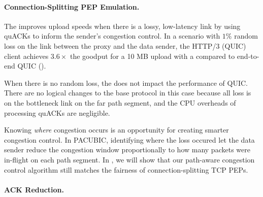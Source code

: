 \paragraph{Connection-Splitting PEP Emulation.}
The \sys improves upload speeds when there is a lossy, low-latency link
by using quACKs to inform the sender's congestion control.
In a scenario with $1\%$ random loss on the link between the proxy and the
data sender, the HTTP/3 (QUIC) client achieves $3.6\times$ the goodput for a 10 MB
upload with a \sys compared to end-to-end QUIC ().

When there is no random loss, the \sys does not impact the performance
of QUIC\@.
There are no logical changes to the base protocol in this case because all loss
is on the
bottleneck link on the far path segment, and the CPU overheads of processing quACKs
are negligible.

Knowing \emph{where} congestion occurs is an opportunity for creating smarter
congestion control.
In PACUBIC, identifying where the loss occured let the data sender
reduce the congestion window proportionally to how many packets were in-flight
on each path segment.
In , we will show that our
path-aware congestion control algorithm still matches the fairness of
connection-splitting TCP PEPs.

\paragraph{ACK Reduction.}

%
%


